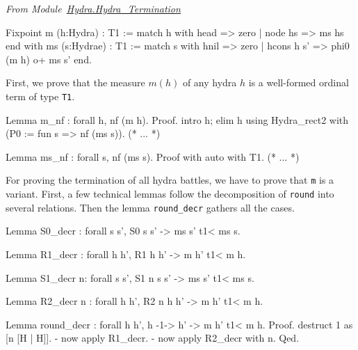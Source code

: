 \vspace{4pt}
\emph{From Module~\href{../theories/html/hydras.Hydra.Hydra_Termination.html\#m}{Hydra.Hydra\_Termination}}

\begin{Coqsrc}
Fixpoint m (h:Hydra) : T1 :=
  match h with head => zero
             | node hs => ms hs
end 
with ms (s:Hydrae) :  T1 :=
  match s with  hnil => zero
              | hcons h s' => phi0 (m h) o+  ms s'
 end.  
\end{Coqsrc}

First, we prove that the measure $m(h)$  of any hydra $h$ is a well-formed ordinal term of type \texttt{T1}.

\begin{Coqsrc}
Lemma m_nf : forall h, nf (m h).
Proof.
 intro h; elim h using Hydra_rect2 
            with (P0 := fun s =>  nf (ms s)).
 (* ... *)

Lemma ms_nf : forall s, nf (ms s).
Proof with auto with T1.
(* ... *)
\end{Coqsrc}

For proving the termination of all hydra battles, we have to prove that
\texttt{m} is a variant. First, a few technical lemmas follow the decomposition of \texttt{round} into several relations. Then the lemma \texttt{round\_decr} gathers all the cases.

\label{sect:variant-decr}

\begin{Coqsrc}
Lemma S0_decr :
  forall s s', S0  s s' -> ms s' t1< ms s.
\end{Coqsrc}

\begin{Coqsrc}
Lemma R1_decr : forall h h',
                  R1 h h' -> m h' t1< m h.
\end{Coqsrc}

\begin{Coqsrc}
Lemma S1_decr n:
  forall s s', S1 n s s' -> ms s' t1<  ms s.
\end{Coqsrc}

\begin{Coqsrc}
Lemma R2_decr n : forall h h', R2 n h h' -> m h'  t1< m h.
\end{Coqsrc}


\begin{Coqsrc}
Lemma round_decr : forall h h', h -1-> h' -> m h' t1< m h.
Proof.
   destruct 1 as [n [H | H]].
   -  now apply R1_decr.
   -  now apply R2_decr with n.
Qed.
\end{Coqsrc}

